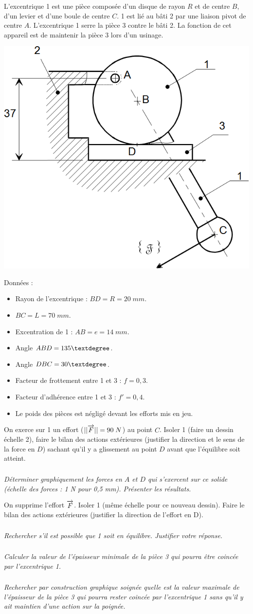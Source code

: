 \documentclass[10pt]{article}
\begin{document}
L'excentrique 1 est une pièce composée d'un disque de rayon $R$ et de centre $B$, d'un levier et d'une boule de centre $C$. 1 est lié au bâti 2 par une liaison pivot de centre $A$. L'excentrique 1 serre la pièce 3 contre le bâti 2. La fonction de cet appareil est de maintenir la pièce 3 lors d'un usinage.

\begin{center}
\includegraphics[width=.6\textwidth]{images/im_03.png}
\end{center}

Données : 
\begin{itemize}
\item Rayon de l'excentrique : $BD = R = 20 \;mm$.
\item $BC = L =70 \; mm$.
\item Excentration de 1 : $AB = e = 14 \; mm$.
\item Angle $ABD = 135\textdegree$.
\item Angle $DBC = 30\textdegree$.
\item Facteur de frottement entre 1 et 3 : $f = 0,3$.
\item Facteur d'adhérence entre 1 et 3 : $f' = 0,4$.
\item Le poids des pièces est négligé devant les efforts mis en jeu.
\end{itemize}

On exerce sur 1 un effort    ($||\overrightarrow{F}|| = 90\;N$) au point $C$. Isoler 1 (faire un dessin échelle 2), faire le bilan des actions extérieures (justifier la direction et le sens de la force en $D$) sachant qu'il y a glissement au point $D$ avant que l'équilibre soit atteint. 
\subparagraph{}
\textit{Déterminer graphiquement les forces en $A$ et $D$ qui s'exercent sur ce solide (échelle des forces : 1 N pour 0,5 mm). Présenter les résultats. }


On supprime l'effort $\overrightarrow{F}$. Isoler 1 (même échelle pour ce nouveau dessin). Faire le bilan des actions extérieures (justifier la direction de l'effort en D). 

\subparagraph{}
\textit{Rechercher s'il est possible que 1 soit en équilibre. Justifier votre réponse.}
\subparagraph{}
\textit{Calculer la valeur de l'épaisseur minimale de la pièce 3 qui pourra être coincée par l'excentrique 1.}
\subparagraph{}
\textit{Rechercher par construction graphique soignée quelle est la valeur maximale de l'épaisseur de la pièce 3 qui pourra rester coincée par l'excentrique 1 sans qu'il y ait maintien d'une action sur la poignée.}
\end{document}
